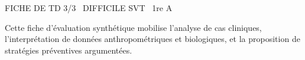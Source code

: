 \documentclass[11pt]{article}
\begin{document}
\begin{tcolorbox}[enhanced,colback=popink,colframe=popink,arc=10pt,boxrule=0pt,left=12pt,right=12pt,top=9pt,bottom=9pt]
{\color{white}\popxbold\small FICHE DE TD 3/3 \textbullet\ DIFFICILE \hfill SVT \textbullet\ 1re A\par}
\end{tcolorbox}
\vspace{4pt}
Cette fiche d'évaluation synthétique mobilise l'analyse de cas cliniques, l'interprétation de données anthropométriques et biologiques, et la proposition de stratégies préventives argumentées.
\end{document}
